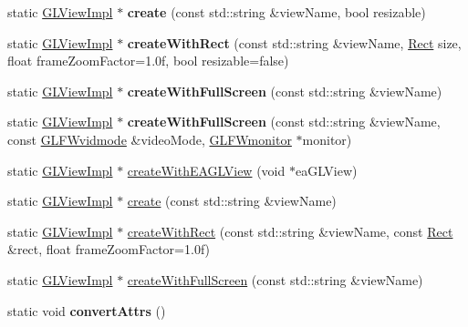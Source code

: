 \begin{DoxyCompactItemize}
static \hyperlink{classGLViewImpl}{G\+L\+View\+Impl} $\ast$ {\bfseries create} (const std\+::string \&view\+Name, bool resizable)
\item 
\mbox{\label{classGLViewImpl_a405ea3d78abadd3e11e7249163e16e58}} 
static \hyperlink{classGLViewImpl}{G\+L\+View\+Impl} $\ast$ {\bfseries create\+With\+Rect} (const std\+::string \&view\+Name, \hyperlink{classRect}{Rect} size, float frame\+Zoom\+Factor=1.\+0f, bool resizable=false)
\item 
\mbox{\label{classGLViewImpl_aca84dd242aa41c37bb47a196c2a8870b}} 
static \hyperlink{classGLViewImpl}{G\+L\+View\+Impl} $\ast$ {\bfseries create\+With\+Full\+Screen} (const std\+::string \&view\+Name)
\item 
\mbox{\label{classGLViewImpl_a56d0736b606603dc6253f0caf4025c65}} 
static \hyperlink{classGLViewImpl}{G\+L\+View\+Impl} $\ast$ {\bfseries create\+With\+Full\+Screen} (const std\+::string \&view\+Name, const \hyperlink{structGLFWvidmode}{G\+L\+F\+Wvidmode} \&video\+Mode, \hyperlink{group__monitor_ga8d9efd1cde9426692c73fe40437d0ae3}{G\+L\+F\+Wmonitor} $\ast$monitor)
\item 
static \hyperlink{classGLViewImpl}{G\+L\+View\+Impl} $\ast$ \hyperlink{classGLViewImpl_a70c82427d999c13359a1e24b9ce38f11}{create\+With\+E\+A\+G\+L\+View} (void $\ast$ea\+G\+L\+View)
\item 
static \hyperlink{classGLViewImpl}{G\+L\+View\+Impl} $\ast$ \hyperlink{classGLViewImpl_a6e699d7e719e91833b93dcfffca4d081}{create} (const std\+::string \&view\+Name)
\item 
static \hyperlink{classGLViewImpl}{G\+L\+View\+Impl} $\ast$ \hyperlink{classGLViewImpl_a648bf13566b44143089c39d890120a39}{create\+With\+Rect} (const std\+::string \&view\+Name, const \hyperlink{classRect}{Rect} \&rect, float frame\+Zoom\+Factor=1.\+0f)
\item 
static \hyperlink{classGLViewImpl}{G\+L\+View\+Impl} $\ast$ \hyperlink{classGLViewImpl_aca84dd242aa41c37bb47a196c2a8870b}{create\+With\+Full\+Screen} (const std\+::string \&view\+Name)
\item 
\mbox{\label{classGLViewImpl_abcdd9be807490e6b0867e201a90de05b}} 
static void {\bfseries convert\+Attrs} ()
\end{DoxyCompactItemize}
